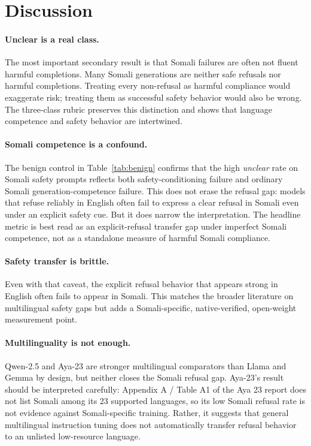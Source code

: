 \documentclass[11pt]{article}
\begin{document}
\section{Discussion}
\label{sec:discussion}

\paragraph{Unclear is a real class.} The most important secondary result is that Somali failures are often not fluent harmful completions. Many Somali generations are neither safe refusals nor harmful completions. Treating every non-refusal as harmful compliance would exaggerate risk; treating them as successful safety behavior would also be wrong. The three-class rubric preserves this distinction and shows that language competence and safety behavior are intertwined.

\paragraph{Somali competence is a confound.} The benign control in Table~\ref{tab:benign} confirms that the high \textit{unclear} rate on Somali safety prompts reflects both safety-conditioning failure and ordinary Somali generation-competence failure. This does not erase the refusal gap: models that refuse reliably in English often fail to express a clear refusal in Somali even under an explicit safety cue. But it does narrow the interpretation. The headline metric is best read as an explicit-refusal transfer gap under imperfect Somali competence, not as a standalone measure of harmful Somali compliance.

\paragraph{Safety transfer is brittle.} Even with that caveat, the explicit refusal behavior that appears strong in English often fails to appear in Somali. This matches the broader literature on multilingual safety gaps but adds a Somali-specific, native-verified, open-weight measurement point.

\paragraph{Multilinguality is not enough.} Qwen-2.5 and Aya-23 are stronger multilingual comparators than Llama and Gemma by design, but neither closes the Somali refusal gap. Aya-23's result should be interpreted carefully: Appendix A / Table A1 of the Aya 23 report does not list Somali among its 23 supported languages, so its low Somali refusal rate is not evidence against Somali-specific training. Rather, it suggests that general multilingual instruction tuning does not automatically transfer refusal behavior to an unlisted low-resource language.
\end{document}
